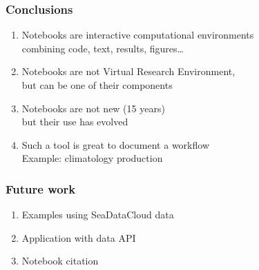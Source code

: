 \begin{frame}

\frametitle{Conclusions}

\begin{enumerate}
\item<1-> Notebooks are interactive computational environments\\
combining code, text, results, figures\ldots
\item<2-> Notebooks are not Virtual Research Environment,\\
but can be one of their components
\item<3-> Notebooks are not new (15 years)\\
but their use has evolved
\item<4-> Such a tool is great to document a workflow\\
Example: climatology production
\end{enumerate}

\end{frame}

\begin{frame}

\frametitle{Future work}

\begin{enumerate}
\item<1-> Examples using SeaDataCloud data
\item<2-> Application with data API 
\item<3-> Notebook citation 
\end{enumerate}

\end{frame}


